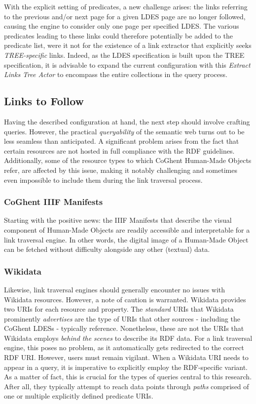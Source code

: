 \documentclass[conference]{IEEEtran}
\begin{document}
With the explicit setting of predicates, a new challenge arises: the links referring to the previous and/or next page for a given LDES page are no longer followed, causing the engine to consider only one page per specified LDES. The various predicates leading to these links could therefore potentially be added to the predicate list, were it not for the existence of a link extractor that explicitly seeks \textit{TREE-specific} links. Indeed, as the LDES specification is built upon the TREE specification, it is advisable to expand the current configuration with this \textit{Extract Links Tree Actor} to encompass the entire collections in the query process. \cite{colpaert2023tree}

\subsection{Links to Follow}
Having the described configuration at hand, the next step should involve crafting queries. However, the practical \textit{queryability} of the semantic web turns out to be less seamless than anticipated. A significant problem arises from the fact that certain resources are not hosted in full compliance with the RDF guidelines. Additionally, some of the resource types to which CoGhent Human-Made Objects refer, are affected by this issue, making it notably challenging and sometimes even impossible to include them during the link traversal process.

\subsubsection{CoGhent IIIF Manifests}
Starting with the positive news: the IIIF Manifests that describe the visual component of Human-Made Objects are readily accessible and interpretable for a link traversal engine. In other words, the digital image of a Human-Made Object can be fetched without difficulty alongside any other (textual) data.

\subsubsection{Wikidata}
Likewise, link traversal engines should generally encounter no issues with Wikidata resources. However, a note of caution is warranted. Wikidata provides two URIs for each resource and property. The \textit{standard} URIs that Wikidata prominently \textit{advertises} are the type of URIs that other sources - including the CoGhent LDESs - typically reference. Nonetheless, these are not the URIs that Wikidata employs \textit{behind the scenes} to describe its RDF data. For a link traversal engine, this poses no problem, as it automatically gets redirected to the correct RDF URI. However, users must remain vigilant. When a Wikidata URI needs to appear in a query, it is imperative to explicitly employ the RDF-specific variant. As a matter of fact, this is crucial for the types of queries central to this research. After all, they typically attempt to reach data points through \textit{paths} comprised of one or multiple explicitly defined predicate URIs.
\end{document}
